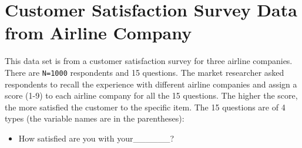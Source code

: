 \documentclass[12pt,]{krantz}
\providecommand{\tightlist}{%
  \setlength{\itemsep}{0pt}\setlength{\parskip}{0pt}}
\theoremstyle{definition}
\theoremstyle{definition}
\theoremstyle{remark}
\begin{document}
\section{Customer Satisfaction Survey Data from Airline
Company}\label{customer-satisfaction-survey-data-from-airline-company}

This data set is from a customer satisfaction survey for three airline
companies. There are \texttt{N=1000} respondents and 15 questions. The
market researcher asked respondents to recall the experience with
different airline companies and assign a score (1-9) to each airline
company for all the 15 questions. The higher the score, the more
satisfied the customer to the specific item. The 15 questions are of 4
types (the variable names are in the parentheses):

\begin{itemize}
\tightlist
\item
  How satisfied are you with your\_\_\_\_\_\_?
\end{itemize}
\end{document}
